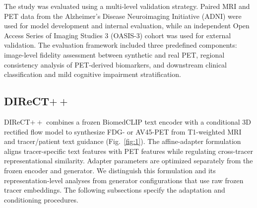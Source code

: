 \documentclass{article}
\begin{document}
The study was evaluated using a multi-level validation strategy. Paired MRI
and PET data from the Alzheimer's Disease Neuroimaging Initiative (ADNI) were
used for model development and internal evaluation, while an independent
Open Access Series of Imaging Studies 3 (OASIS-3) cohort was used for
external validation. The evaluation framework included three predefined
components: image-level fidelity assessment between synthetic and real PET,
regional consistency analysis of PET-derived biomarkers, and downstream
clinical classification and mild cognitive impairment stratification.


\subsection{\texorpdfstring{DIReCT$++$}{DIReCT++}}
DIReCT$++$ combines a frozen BiomedCLIP text encoder with a conditional 3D rectified flow model to synthesize FDG- or AV45-PET from T1-weighted MRI and tracer/patient text guidance (Fig.~\ref{fig:1}). The affine-adapter formulation aligns tracer-specific text features with PET features while regulating cross-tracer representational similarity. Adapter parameters are optimized separately from the frozen encoder and generator. We distinguish this formulation and its representation-level analyses from generator configurations that use raw frozen tracer embeddings. The following subsections specify the adaptation and conditioning procedures.
\end{document}
